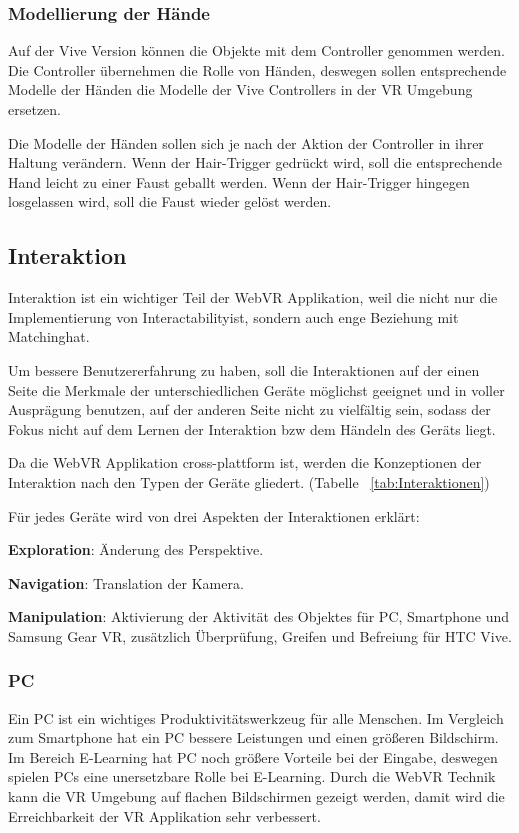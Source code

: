    \subsubsection{Modellierung der Hände}
   Auf der Vive Version können die Objekte mit dem Controller genommen werden. Die Controller übernehmen die Rolle von Händen, deswegen sollen entsprechende Modelle der Händen die Modelle der Vive Controllers in der VR Umgebung ersetzen.
   
   Die Modelle der Händen sollen sich je nach der Aktion der Controller in ihrer Haltung verändern. Wenn der Hair-Trigger gedrückt wird, soll die entsprechende Hand leicht zu einer Faust geballt werden. Wenn der Hair-Trigger hingegen losgelassen wird, soll die Faust wieder gelöst werden.

 \subsection{Interaktion}
 Interaktion ist ein wichtiger Teil der WebVR Applikation, weil die nicht nur die Implementierung von \glqq Interactability\grqq ist, sondern auch enge Beziehung mit \glqq Matching\grqq hat.
 
 Um bessere Benutzererfahrung zu haben, soll die Interaktionen auf der einen Seite die Merkmale der unterschiedlichen Geräte möglichst geeignet und in voller Ausprägung benutzen, auf der anderen Seite nicht zu vielfältig sein, sodass der Fokus nicht auf dem Lernen der Interaktion bzw dem Händeln des Geräts liegt. 
 
 Da die WebVR Applikation cross-plattform ist, werden die Konzeptionen der Interaktion nach den Typen der Geräte gliedert. (Tabelle ~\ref{tab:Interaktionen})

 Für jedes Geräte wird von drei Aspekten der Interaktionen erklärt:
 
 \textbf{Exploration}: Änderung des Perspektive.
 
 \textbf{Navigation}: Translation der Kamera.
 
 \textbf{Manipulation}: Aktivierung der Aktivität des Objektes für PC, Smartphone und Samsung Gear VR, zusätzlich Überprüfung, Greifen und Befreiung für HTC Vive.

 \subsubsection{PC}
 Ein PC ist ein wichtiges Produktivitätswerkzeug für alle Menschen. Im Vergleich zum Smartphone hat ein PC bessere Leistungen und einen größeren Bildschirm. Im Bereich E-Learning hat PC noch größere Vorteile bei der Eingabe, deswegen spielen PCs eine unersetzbare Rolle bei E-Learning. Durch die WebVR Technik kann die VR Umgebung auf flachen Bildschirmen gezeigt werden, damit wird die Erreichbarkeit der VR Applikation sehr verbessert. 
  
